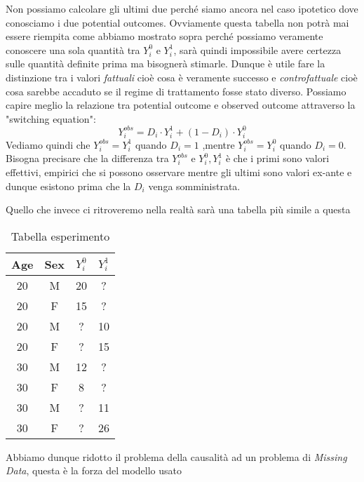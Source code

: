 \documentclass{article}
\begin{document}
Non possiamo calcolare gli ultimi due perché siamo ancora nel caso ipotetico dove conosciamo i due potential outcomes.
Ovviamente questa tabella non potrà mai essere riempita come abbiamo mostrato sopra perché possiamo veramente conoscere una sola quantità tra $Y^0_{i}$ e $Y^1_{i}$, sarà quindi impossibile avere certezza sulle quantità definite prima ma bisognerà stimarle. 
Dunque è utile fare la distinzione tra i valori \textit{fattuali} cioè cosa è veramente successo e \textit{controfattuale} cioè cosa sarebbe accaduto se il regime di trattamento fosse stato diverso.
Possiamo capire meglio la relazione tra potential outcome e observed outcome attraverso la  "switching equation": 
\begin{equation}
Y_i^{obs} = D_i \cdot Y^1_i + (1-D_i) \cdot Y^0_i
\label{eq:switching}
\end{equation}
Vediamo quindi che $Y_i^{obs} = Y^1_i$ quando $D_i =1$ ,mentre $Y_i^{obs} = Y^0_i$ quando $D_i = 0$. 
Bisogna precisare che la differenza tra $Y_i^{obs}$ e $Y^0_i,Y^1_i$ è che i primi sono valori effettivi, empirici che si possono osservare mentre gli ultimi sono valori ex-ante e dunque esistono prima che la $D_i$ venga somministrata.

Quello che invece ci ritroveremo nella realtà sarà una tabella più simile a questa 
\begin{table}[H]
\centering
\begin{tabular}{|c|c|c|c|}
\hline
Age & Sex & $Y^{0}_i$ & $Y^{1}_i$ \\ \hline
20 & M & 20 & ?  \\ \hline
20 & F & 15 & ? \\ \hline
20 & M & ? & 10 \\ \hline
20 & F & ? & 15  \\ \hline
30 & M & 12 & ? \\ \hline
30 & F & 8 & ? \\ \hline
30 & M & ? & 11   \\ \hline
30 & F & ? & 26 \\ \hline
\end{tabular}
\caption{Tabella esperimento }
\end{table}
Abbiamo dunque ridotto il problema della causalità ad un problema di \textit{Missing Data}, questa è la forza del modello usato
\end{document}
